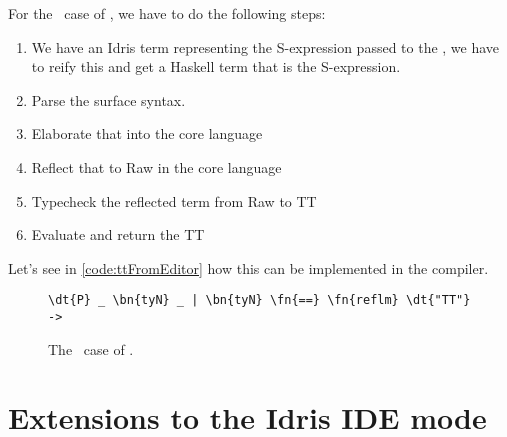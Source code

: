 For the \TT\ case of , we have to do the following steps:
\begin{enumerate}
  \item We have an Idris term  representing the S-expression passed to
    the , we have to reify this and get a Haskell term
    that is the S-expression.
  \item Parse the surface syntax.
  \item Elaborate that into the core language
  \item Reflect that to Raw in the core language
  \item Typecheck the reflected term from Raw to TT
  \item Evaluate and return the TT
\end{enumerate}

Let's see in \autoref{code:ttFromEditor} how this can be implemented in the compiler.

\begin{figure}[ht]
\caption{The \TT\ case of .}
\label{code:ttFromEditor}
\begin{Verbatim}[framesep=2mm, label=\footnotesize{\normalfont{Haskell}}, labelposition=topline]
\dt{P} _ \bn{tyN} _ | \bn{tyN} \fn{==} \fn{reflm} \dt{"TT"} ->
\end{Verbatim}
\end{figure}


\section{Extensions to the Idris IDE mode}\label{sec:idemode}
